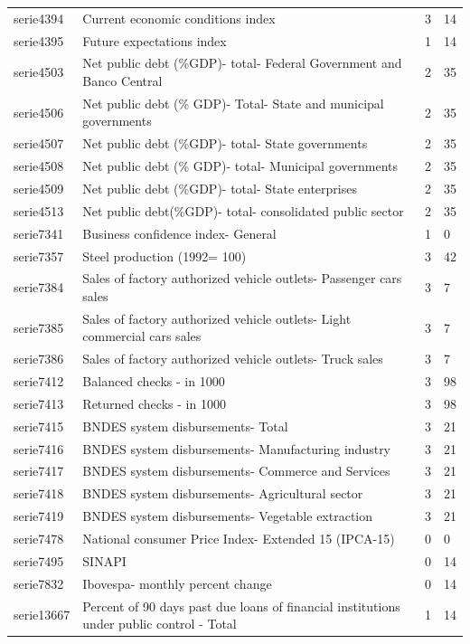 \documentclass{article}
\begin{document}
\begin{landscape}
\begin{center}
\begin{longtable}{|l|l|l|l|}
serie4394 & Current economic conditions index & 3 & 14 \\
serie4395 & Future expectations index & 1 & 14 \\
serie4503 & Net public debt (\%GDP)- total- Federal Government and Banco Central & 2 & 35 \\
serie4506 & Net public debt (\% GDP)- Total- State and municipal governments & 2 & 35 \\
serie4507 & Net public debt (\%GDP)- total- State governments & 2 & 35 \\
serie4508 & Net public debt (\% GDP)- total- Municipal governments & 2 & 35 \\
serie4509 & Net public debt (\%GDP)- total- State enterprises & 2 & 35 \\
serie4513 & Net public debt(\%GDP)- total- consolidated public sector & 2 & 35 \\
serie7341 & Business confidence index- General & 1 & 0 \\
serie7357 & Steel production (1992= 100) & 3 & 42 \\
serie7384 & Sales of factory authorized vehicle outlets- Passenger cars sales & 3 & 7 \\
serie7385 & Sales of factory authorized vehicle outlets- Light commercial cars sales & 3 & 7 \\
serie7386 & Sales of factory authorized vehicle outlets- Truck sales & 3 & 7 \\
serie7412 & Balanced checks - in 1000 & 3 & 98 \\
serie7413 & Returned checks - in 1000 & 3 & 98 \\
serie7415 & BNDES system disbursements- Total & 3 & 21 \\
serie7416 & BNDES system disbursements- Manufacturing industry & 3 & 21 \\
serie7417 & BNDES system disbursements- Commerce and Services & 3 & 21 \\
serie7418 & BNDES system disbursements- Agricultural sector & 3 & 21 \\
serie7419 & BNDES system disbursements- Vegetable extraction & 3 & 21 \\
serie7478 & National consumer Price Index- Extended 15 (IPCA-15) & 0 & 0 \\
serie7495 & SINAPI & 0 & 14 \\
serie7832 & Ibovespa- monthly percent change & 0 & 14 \\
serie13667 & Percent of 90 days past due loans of financial institutions under public control - Total & 1 & 14 \\

\end{longtable}
\end{center}
\end{landscape}
\end{document}
